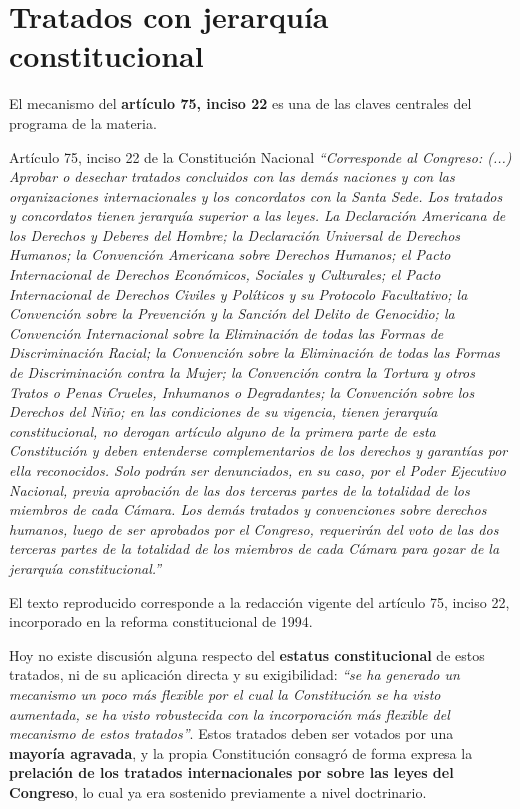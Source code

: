 \documentclass[12pt,oneside]{book}
\begin{document}
\section{Tratados con jerarquía constitucional}

El mecanismo del \textbf{artículo 75, inciso 22} es una de las claves centrales del programa de la materia.

\begin{norma}{Artículo 75, inciso 22 de la Constitución Nacional}
\textit{``Corresponde al Congreso: (...) Aprobar o desechar tratados concluidos con las demás naciones y con las organizaciones internacionales y los concordatos con la Santa Sede. Los tratados y concordatos tienen jerarquía superior a las leyes. La Declaración Americana de los Derechos y Deberes del Hombre; la Declaración Universal de Derechos Humanos; la Convención Americana sobre Derechos Humanos; el Pacto Internacional de Derechos Económicos, Sociales y Culturales; el Pacto Internacional de Derechos Civiles y Políticos y su Protocolo Facultativo; la Convención sobre la Prevención y la Sanción del Delito de Genocidio; la Convención Internacional sobre la Eliminación de todas las Formas de Discriminación Racial; la Convención sobre la Eliminación de todas las Formas de Discriminación contra la Mujer; la Convención contra la Tortura y otros Tratos o Penas Crueles, Inhumanos o Degradantes; la Convención sobre los Derechos del Niño; en las condiciones de su vigencia, tienen jerarquía constitucional, no derogan artículo alguno de la primera parte de esta Constitución y deben entenderse complementarios de los derechos y garantías por ella reconocidos. Solo podrán ser denunciados, en su caso, por el Poder Ejecutivo Nacional, previa aprobación de las dos terceras partes de la totalidad de los miembros de cada Cámara. Los demás tratados y convenciones sobre derechos humanos, luego de ser aprobados por el Congreso, requerirán del voto de las dos terceras partes de la totalidad de los miembros de cada Cámara para gozar de la jerarquía constitucional.''}

\medskip
El texto reproducido corresponde a la redacción vigente del artículo 75, inciso 22, incorporado en la reforma constitucional de 1994.
\end{norma}

Hoy no existe discusión alguna respecto del \textbf{estatus constitucional} de estos tratados, ni de su aplicación directa y su exigibilidad: \textit{``se ha generado un mecanismo un poco más flexible por el cual la Constitución se ha visto aumentada, se ha visto robustecida con la incorporación más flexible del mecanismo de estos tratados''}. Estos tratados deben ser votados por una \textbf{mayoría agravada}, y la propia Constitución consagró de forma expresa la \textbf{prelación de los tratados internacionales por sobre las leyes del Congreso}, lo cual ya era sostenido previamente a nivel doctrinario.
\end{document}
